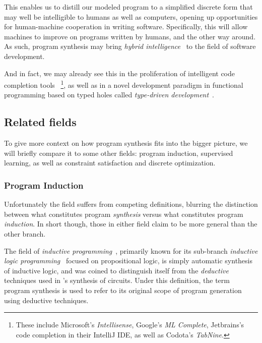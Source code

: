 \documentclass{article}
\begin{document}
This enables us to distill our modeled program
to a simplified discrete form that may well be intelligible to humans as well as computers,
opening up opportunities for human-machine cooperation in writing software.
Specifically, this will allow machines to improve on programs written by humans, and the other way around.
As such, program synthesis may bring \emph{hybrid intelligence}~\citep{sun1994computational} to the field of software development.

And in fact, we may already see this in the proliferation of intelligent code completion tools%
~\footnote{
    These include Microsoft's \emph{Intellisense},
    Google's \emph{ML Complete},
    Jetbrains's code completion in their IntelliJ IDE,
    as well as Codota's \emph{TabNine}.
},
as well as in a novel development paradigm in functional programming based on typed holes called \emph{type-driven development}~\citep{brady2017type}.

\subsection{Related fields}

To give more context on how program synthesis fits into the bigger picture,
we will briefly compare it to some other fields: program induction, supervised learning, as well as constraint satisfaction and discrete optimization.

\subsubsection{Program Induction}

Unfortunately the field suffers from competing definitions, blurring the distinction between what constitutes program \emph{synthesis} versus what constitutes program \emph{induction}. In short though, those in either field claim to be more general than the other branch.

The field of \emph{inductive programming}~\citep{popplestone1969experiment,plotkin1970note,fogel1966intelligent}, primarily known for its sub-branch \emph{inductive logic programming}~\citep{muggleton1991inductive} focused on propositional logic, is simply automatic synthesis of inductive logic, and was coined to distinguish itself from the \emph{deductive} techniques used in \citet{church1957applications}'s synthesis of circuits. Under this definition, the term program synthesis is used to refer to its original scope of program generation using deductive techniques.
\end{document}
